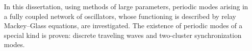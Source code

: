 In this dissertation, using methods of large parameters, periodic modes arising in a fully coupled network of oscillators, whose functioning is described by relay Mackey--Glass equations, are investigated. The existence of periodic modes of a special kind is proven: discrete traveling waves and two-cluster synchronization modes.







%
%
%	

